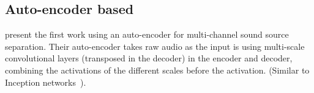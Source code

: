 \subsection{Auto-encoder based}
\textcite{graisRaw2018a} present the first work using an auto-encoder for multi-channel sound source separation. Their auto-encoder takes raw audio as the input is using multi-scale convolutional layers (transposed in the decoder) in the encoder and decoder, combining the activations of the different scales before the activation. (Similar to Inception networks~\cite{szegedyGoing2014}).
